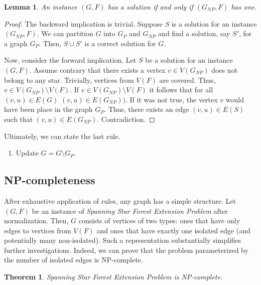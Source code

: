\documentclass[en]{pracamgr}
\newtheorem{theorem}{Theorem}
\newtheorem{lemma}{Lemma}
\newcommand{\ssfe}{\emph{Spanning Star Forest Extension Problem}}
\begin{document}
\begin{lemma}
	An instance $(G,F)$ has a solution if and only if $(G_{NP},F)$ has one.
\end{lemma}

\begin{proof}
	The backward implication is trivial. Suppose $S$ is a solution for an instance $(G_{NP},F)$. We can partition $G$ into $G_P$ and $G_{NP}$ and find a solution, say $S'$, for a graph $G_P$. Then, $S \cup S'$ is a correct solution for $G$.
	
	Now, consider the forward implication. Let $S$ be a solution for an instance $(G, F)$. Assume contrary that there exists a vertex $v \in V(G_{NP})$ does not belong to any star. Trivially, vertices from $V(F)$ are covered. Thus, $v \in V(G_{NP}) \setminus V(F)$. If $v \in V(G_{NP}) \setminus V(F)$ it follows that for all $(v,u) \in E(G)$ $(v,u) \in E(G_{NP}))$. If it was not true, the vertex $v$ would have been place in the graph $G_P$. Thus, there exists an edge $(v,u) \in E(S)$ such that $(v,u) \in E(G_{NP})$. Contradiction.
	
\end{proof}
\noindent
Ultimately, we can state the last rule.
\begin{enumerate}[leftmargin=*,label=\textbf{Reduction \arabic{enumi}},resume]
	\item Update $G = G \setminus G_P$.
\end{enumerate}

\subsection{NP-completeness}

After exhaustive application of rules, any graph has a simple structure. Let $(G,F)$ be an instance of \ssfe{} after normalization. Then, $G$ consists of vertices of two types: ones that have only edges to vertices from $V(F)$ and ones that have exactly one isolated edge (and potentially many non-isolated). Such a representation substantially simplifies further investigations. Indeed, we can prove that the problem parameterized by the number of isolated edges is NP-complete.



\begin{theorem}
	\ssfe{} is NP-complete.
\end{theorem}
\end{document}
